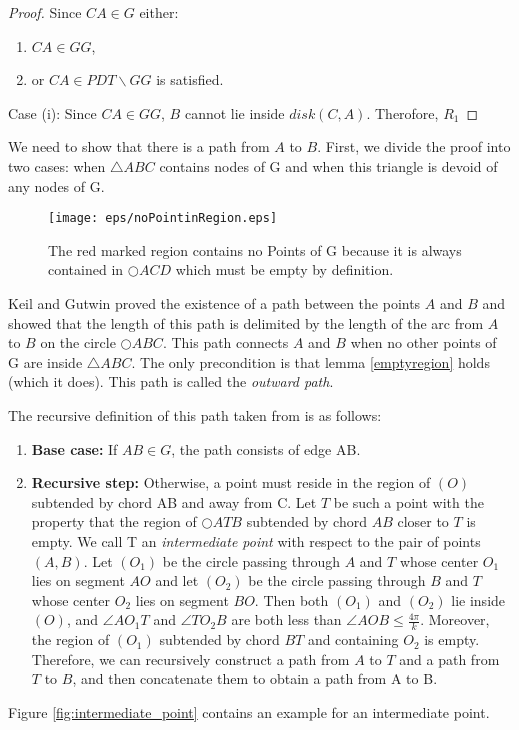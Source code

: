\begin{proof}
Since $CA \in G $ either: 
\begin{enumerate}
\renewcommand{\labelenumi}{(\roman{enumi})}
\item $CA \in GG $,
\item or $CA \in PDT\backslash GG $ is satisfied.
\end{enumerate} 
Case (i): 
Since $CA \in GG $, $B $ cannot lie inside $disk(C,A) $.
Therofore, $R_1 $
\end{proof} 



We need to show that there is a path from $A $ to $B $.
First, we divide the proof into two cases: when $\triangle{ABC} $ contains nodes of G and when this triangle is devoid of any nodes of G.

\begin{figure}[h!]
\centering
\texttt{[image: eps/noPointinRegion.eps]}
\caption{The red marked region contains no Points of G because it is always contained in $\bigcirc{ACD} $ which must be empty by definition.}
\label{fig:empty_region}
\end{figure}

Keil and Gutwin \cite{keil} proved the existence of a path between the points $A $ and $B $ and showed that the length of this path is delimited by the length of the arc from $A $ to $B $ on the circle $\bigcirc{ABC} $.
This path connects $A $ and $B $ when no other points of G are inside $\triangle{ABC} $.
The only precondition is that lemma \ref{emptyregion} holds (which it does).
This path is called the \emph{outward path}.

The recursive definition of this path taken from \cite{kanj} is as follows:
\begin{enumerate}
\item \textbf{Base case:} If $AB \in G $, the path consists of edge AB.
\item \textbf{Recursive step:} Otherwise, a point must reside in the region of $(O) $ subtended by chord AB and away from C. 
Let $T $ be such a point with the property that the region of $\bigcirc{ATB} $ subtended by chord $AB $ closer to $T $ is empty. 
We call T an \emph{intermediate point} with respect to the pair of points $(A, B) $.
Let $(O_1) $ be the circle passing through $A $ and $T $ whose center $O_1 $ lies on segment $AO $  and let $(O_2) $ be the circle passing through $B $ and $T $ whose center $O_2 $ lies on segment $BO $.
Then both $(O_1) $ and $(O_2) $ lie inside $(O) $, and $\angle{AO_1T} $ and $\angle{TO_2B} $ are both less than $\angle{AOB} \leq \frac{4\pi}{k} $.
Moreover, the region of $(O_1) $ subtended by chord $BT $ and containing $O_2 $ is empty. Therefore, we can recursively construct a path from $A $ to $T $ and a path from $T $ to $B $, and then concatenate them to obtain a path from A to B.  
\end{enumerate}
Figure \ref{fig:intermediate_point} contains an example for an intermediate point.


